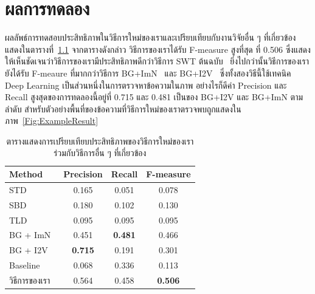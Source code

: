 \chapter{ผลการทดลอง}
\label{chapter:result}

ผลลัพธ์การทดสอบประสิทธิภาพในวิธีการใหม่ของเราและเปรียบเทียบกับงานวิจัยอื่น ๆ ที่เกี่ยวข้อง แสดงในตารางที่~\ref{Table:ExperimentalResults} จากตารางดังกล่าว วิธีการของเราได้รับ F-measure สูงที่สุด ที่ 0.506 ซึ่งแสดงให้เห็นชัดเจนว่าวิธีการของเรามีประสิทธิภาพดีกว่าวิธีการ SWT ต้นฉบับ~\cite{5540041} ยิ่งไปกว่านั้นวิธีการของเรายังได้รับ F-meaure ที่มากกว่าวิธีการ BG+ImN~\cite{7532890} และ BG+I2V~\cite{7532890} ซึ่งทั้งสองวิธีนี้ใช้เทคนิค Deep Learning เป็นส่วนหนึ่งในการตรวจหาข้อความในภาพ อย่างไรก็ดีค่า Precision และ Recall สูงสุดของการทดลองนี้อยู่ที่ 0.715 และ 0.481 เป็นของ BG+I2V และ BG+ImN ตามลำดับ สำหรับตัวอย่างพื้นที่ของข้อความที่วิธีการใหม่ของเราตรวจพบถูกแสดงในภาพ~\ref{Fig:ExampleResult}

\begin{table}[!h]    
    \centering
    \begin{tabular}{lccc}
        \hline
        Method & Precision & Recall & F-measure \\ \hline \hline
        STD~\cite{6628665} & 0.165 & 0.051 & 0.078 \\
        SBD~\cite{6761596} & 0.180 & 0.102 & 0.130 \\
        TLD~\cite{rigaud:hal-00841492} & 0.095 & 0.095 & 0.095 \\
        BG + ImN~\cite{7532890} & 0.451 & \textbf{0.481} & 0.466 \\
        BG + I2V~\cite{7532890} & \textbf{0.715} & 0.191 & 0.301 \\
        Baseline~\cite{5540041} & 0.068     & 0.336 & 0.113 \\
        วิธีการของเรา & 0.564     & 0.458 & \textbf{0.506} \\ \hline
    \end{tabular}
    \caption{ตารางแสดงการเปรียบเทียบประสิทธิภาพของวิธีการใหม่ของเราร่วมกับวิธีการอื่น ๆ ที่เกี่ยวข้อง}
    \label{Table:ExperimentalResults}
\end{table}


